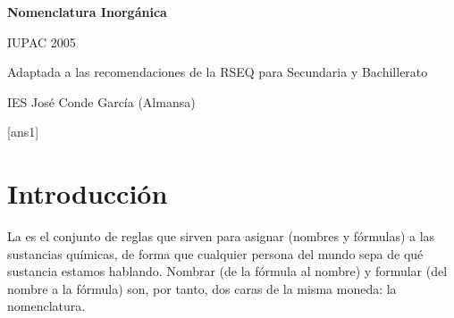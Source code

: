 \documentclass[12pt]{article}
\theoremstyle{mygreennumbox}
\begin{document}
\begin{titlepage}
    \vspace*{5cm}
    \begin{center}
        {\Huge{ \bfseries Nomenclatura Inorgánica}}
    \end{center}
    \vspace*{2cm}
    \begin{center}
        {\huge  IUPAC 2005}\par\medskip
        {\Large Adaptada a las recomendaciones de la RSEQ para Secundaria y Bachillerato}
    \end{center}
    \vspace*{5cm}
    \begin{center}
        {\Large IES José Conde García (Almansa)}
    \end{center}
\end{titlepage}

\tableofcontents

\newpage

[ans1]

\section{Introducción}

La  es el conjunto de reglas que sirven para asignar  (nombres y fórmulas) a las sustancias químicas, de forma que cualquier persona del mundo sepa de qué sustancia estamos hablando. Nombrar (de la fórmula al nombre) y formular (del nombre a la fórmula) son, por tanto, dos caras de la misma moneda: la nomenclatura.
\end{document}
